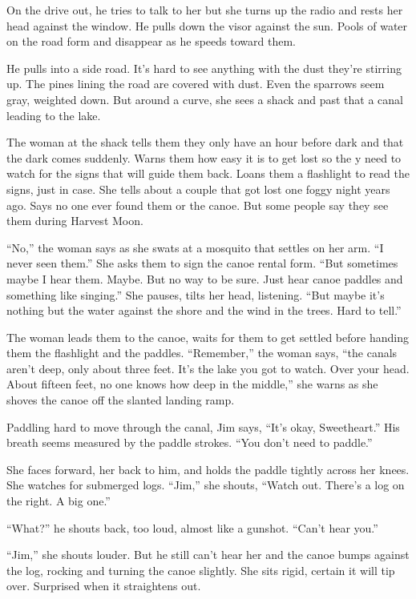 \documentclass[
]{article}
\begin{document}
On the drive out, he tries to talk to her but she turns up the radio and
rests her head against the window. He pulls down the visor against the
sun. Pools of water on the road form and disappear as he speeds toward
them.

He pulls into a side road. It's hard to see anything with the dust
they're stirring up. The pines lining the road are covered with dust.
Even the sparrows seem gray, weighted down. But around a curve, she sees
a shack and past that a canal leading to the lake.

The woman at the shack tells them they only have an hour before dark and
that the dark comes suddenly. Warns them how easy it is to get lost so
the y need to watch for the signs that will guide them back. Loans them
a flashlight to read the signs, just in case. She tells about a couple
that got lost one foggy night years ago. Says no one ever found them or
the canoe. But some people say they see them during Harvest Moon.

``No,'' the woman says as she swats at a mosquito that settles on her
arm. ``I never seen them.'' She asks them to sign the canoe rental form.
``But sometimes maybe I hear them. Maybe. But no way to be sure. Just
hear canoe paddles and something like singing.'' She pauses, tilts her
head, listening. ``But maybe it's nothing but the water against the
shore and the wind in the trees. Hard to tell.''

The woman leads them to the canoe, waits for them to get settled before
handing them the flashlight and the paddles. ``Remember,'' the woman
says, ``the canals aren't deep, only about three feet. It's the lake you
got to watch. Over your head. About fifteen feet, no one knows how deep
in the middle,'' she warns as she shoves the canoe off the slanted
landing ramp.

Paddling hard to move through the canal, Jim says, ``It's okay,
Sweetheart.'' His breath seems measured by the paddle strokes. ``You
don't need to paddle.''

She faces forward, her back to him, and holds the paddle tightly across
her knees. She watches for submerged logs. ``Jim,'' she shouts, ``Watch
out. There's a log on the right. A big one.''

``What?'' he shouts back, too loud, almost like a gunshot. ``Can't hear
you.''

``Jim,'' she shouts louder. But he still can't hear her and the canoe
bumps against the log, rocking and turning the canoe slightly. She sits
rigid, certain it will tip over. Surprised when it straightens out.
\end{document}
